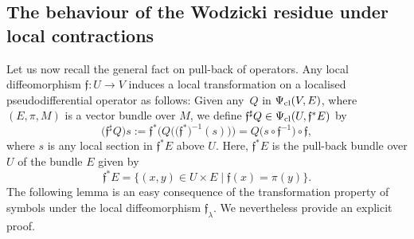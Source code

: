 \documentclass[pdftex]{sigma}
\numberwithin{equation}{section}
\theoremstyle{definition}
\begin{document}
\subsection{The behaviour of the Wodzicki residue under local contractions}
Let us now recall the general fact on pull-back of operators. Any local diffeomorphism $\mathfrak{f}\colon U\to V$ induces a local transformation on a localised pseudodifferential {operator} as follows: Given any~$Q$ in $\Psi_{\rm cl}(V,E)$, where $(E,\pi,M)$ is a vector bundle over $M$, we define $\mathfrak{f}^\sharp Q\in \Psi_{\rm cl}(U,\mathfrak{f}^*E)$ by
\begin{equation}\label{eq:flambda}
 \bigl(\mathfrak{f}^\sharp Q\bigr) s:= \mathfrak{f}^* \bigl( Q\bigl(\bigl( \mathfrak{f}^*\bigr)^{-1}(s)\bigr)\bigr)= Q\bigl(s\circ \mathfrak{f}^{-1} \bigr)\circ \mathfrak{f},
 \end{equation}
where $s$ is any local section in $\mathfrak{f}^*E$ above $U$. Here, $\mathfrak{f}^*E$ is the pull-back bundle over $U$ of the bundle $E$ given by
\[\mathfrak{f}^*E=\{(x,y)\in U\times E \mid \mathfrak{f}(x)=\pi(y)\}.\]
The following lemma is an easy consequence of the transformation property of symbols under the local diffeomorphism ${\mathfrak f}_{ \lambda}$. We nevertheless provide an explicit proof.
\end{document}
